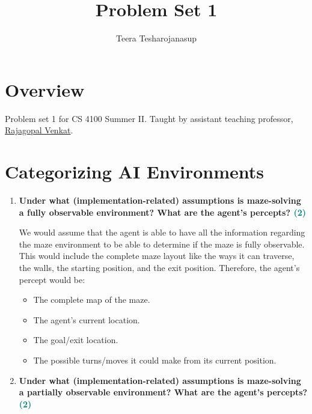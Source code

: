 \documentclass[a4paper]{article}
\begin{document}
\title{\textbf{\huge{Problem Set 1}}}

\author{\textbf\large{Teera Tesharojanasup}}


\date{}

\maketitle
\begin{sloppypar}

\section*{Overview}

Problem set 1 for CS 4100 Summer II. Taught by assistant teaching professor, \href{https://rajagopalvenkat.com/}{Rajagopal Venkat}. \cite{MISC:1}

\section{Categorizing AI Environments}

\begin{enumerate}[start=1,label=Q\arabic*,left=0pt]
    \item \textbf{Under what (implementation-related) assumptions is maze-solving a fully observable environment? What are the agent’s percepts? \hfill \textcolor{teal}{(2)}}
    
    \par We would assume that the agent is able to have all the information regarding the maze environment to be able to determine if the maze
    is fully observable. 
    This would include the complete maze layout like the ways it can traverse, the walls, the starting position, and the exit position.
    Therefore, the agent's percept would be:
    \begin{itemize}
        \item The complete map of the maze.
        \item The agent's current location.
        \item The goal/exit location.
        \item The possible turns/moves it could make from its current position.
    \end{itemize}
    
    \item \textbf{Under what (implementation-related) assumptions is maze-solving a partially observable environment? What are the agent’s percepts? \hfill \textcolor{teal}{(2)}}
    

\end{enumerate}
\end{sloppypar}
\end{document}
